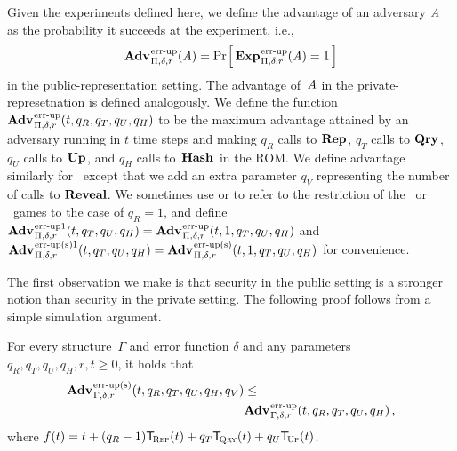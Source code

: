 Given the experiments defined here, we define the advantage of an adversary
$\mathit{A}$ as the probability it succeeds at the experiment, i.e.,
\[\Adv{\errep}_{\struct,\delta,r}(\advA) = \Prob{\Exp{\errep}_{\struct,\delta,r}(\advA) = 1}\]
in the public-representation setting. The advantage of~$\mathit{A}$ in the
private-represetnation is defined analogously.
%
We define the function
$\Adv{\errep}_{\struct,\delta,r}(t,q_R,q_T,q_U,q_H)$ to be the maximum advantage
attained by an adversary running in $t$ time steps and making $q_R$ calls to
$\textup{\textbf{Rep}}\hspace{0.5pt}$, $q_T$ calls to $\textup{\textbf{Qry}}\hspace{0.5pt}$, $q_U$ calls to $\textup{\textbf{Up}}\hspace{0.5pt}$, and $q_H$ calls
to~$\textup{\textbf{Hash}}\hspace{0.5pt}$ in the ROM. We define advantage similarly for \erreps\ except that
we add an extra parameter $q_V$ representing the number of calls to $\mathbf{Reveal}$. We
sometimes use  or  to refer to the restriction of the \errep\ or
\erreps\ games to the case of $q_R = 1$, and define
$\Adv{\errep1}_{\struct,\delta,r}(t,q_T,q_U,q_H) = \Adv{\errep}_{\struct,\delta,r}(t,1,q_T,q_U,q_H)$
and $\Adv{\erreps1}_{\struct,\delta,r}(t,q_T,q_U,q_H) = \Adv{\erreps}_{\struct,\delta,r}(t,1,q_T,q_U,q_H)$
for convenience.

The first observation we make is that security in the public setting is a
stronger notion than security in the private setting. The following proof
follows from a simple simulation argument.

\begin{lemma}\label{thm:errep-to-erreps}
  For every structure~$\Gamma$ and error function $\delta$ and any parameters
  $q_R, q_T, q_U, q_H, r, t \geq 0$, it holds that
  \begin{eqnarray*}
    \begin{aligned}
      \Adv{\erreps}_{\Gamma,\delta,r}(t, q_R, q_T, q_U, q_H, q_V) &\leq \\
      & \Adv{\errep}_{\Gamma,\delta,r}(t, q_R, q_T, q_U, q_H) \,,
    \end{aligned}
  \end{eqnarray*}
  where $f(t) = t + (q_R-1)\ticks(\Rep,t) + q_T\ticks(\Qry,t) + q_U\ticks(\Up,t)$.
\end{lemma}


